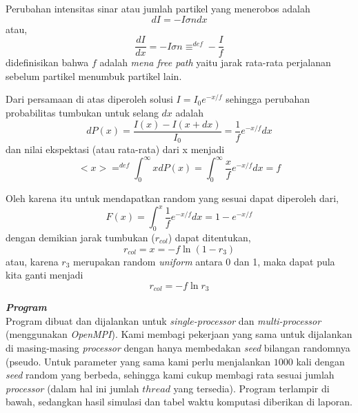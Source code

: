 \documentclass[paper=a4, fontsize=11pt]{scrartcl}
\numberwithin{equation}{section} %
\numberwithin{figure}{section} %
\numberwithin{table}{section} %
\begin{document}
Perubahan intensitas sinar atau jumlah partikel yang menerobos adalah
\begin{equation*}
dI = -I \sigma n dx
\end{equation*}
atau,
\begin{equation*}
\frac{dI}{dx} = -I \sigma n \equiv^{def} -\frac{I}{f}
\end{equation*}
didefinisikan bahwa $f$ adalah \textit{mena free path} yaitu jarak rata-rata perjalanan sebelum partikel menumbuk partikel lain.

Dari persamaan di atas diperoleh solusi $I = I_0 e^{-x/f}$ sehingga perubahan probabilitas tumbukan untuk selang $dx$ adalah
\begin{equation*}
dP(x) = \frac{I(x) - I(x+dx)}{I_0} = \frac{1}{f} e^{-x/f} dx
\end{equation*}
dan nilai ekspektasi (atau rata-rata) dari x menjadi
\begin{equation*}
<x> =^{def} \int_0^{\infty} x dP(x) = \int_0^{\infty} \frac{x}{f} e^{-x/f} dx = f
\end{equation*}

Oleh karena itu untuk mendapatkan random yang sesuai dapat diperoleh dari,
\begin{equation*}
F(x) = \int_0^x \frac{1}{f} e^{-x/f} dx = 1 - e^{-x/f}
\end{equation*}
dengan demikian jarak tumbukan ($r_{col}$) dapat ditentukan,
\begin{equation*}
r_{col} = x = -f \ln (1-r_3)
\end{equation*}
atau, karena $r_3$ merupakan random \textit{uniform} antara 0 dan 1, maka dapat pula kita ganti menjadi
\begin{equation*}
r_{col} = -f \ln r_3
\end{equation*}

\vspace{1.5cm}
\textbf{\textit{Program}}\\
Program dibuat dan dijalankan untuk \textit{single-processor} dan \textit{multi-processor} (menggunakan \textit{OpenMPI}). Kami membagi pekerjaan yang sama untuk dijalankan di masing-masing \textit{processor} dengan hanya membedakan \textit{seed} bilangan randomnya (pseudo. Untuk parameter yang sama kami perlu menjalankan $1000$ kali dengan \textit{seed} random yang berbeda, sehingga kami cukup membagi rata sesuai jumlah \textit{processor} (dalam hal ini jumlah $thread$ yang tersedia). Program terlampir di bawah, sedangkan hasil simulasi dan tabel waktu komputasi diberikan di laporan.
\end{document}

